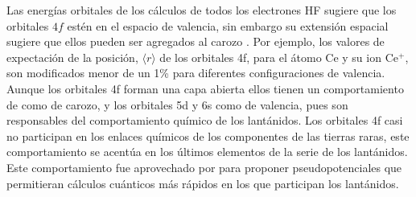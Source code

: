 Las energ\'ias orbitales de los c\'alculos de todos los electrones HF
sugiere que los orbitales $4f$ est\'en en el espacio de valencia, sin 
embargo su extensi\'on espacial sugiere que ellos pueden ser 
agregados al carozo \citep{Dolg1989}. Por ejemplo, los valores de
expectaci\'on de la posici\'on, $\langle r \rangle$ de los orbitales
4f, para el \'atomo Ce y su ion Ce$^+$, son modificados menor de un 
1\% para diferentes configuraciones de valencia. Aunque los orbitales
4f forman una capa abierta ellos tienen un comportamiento de como de
carozo, y los orbitales 5d y 6s como de valencia, pues son 
responsables del comportamiento qu\'imico de los lant\'anidos. Los 
orbitales 4f casi no participan en los enlaces qu\'imicos de los 
componentes de las tierras raras, este comportamiento se acent\'ua en
los \'ultimos elementos de la serie de los lant\'anidos. Este 
comportamiento fue aprovechado por \cite{Dolg1989} para proponer
pseudopotenciales que permitieran c\'alculos cu\'anticos m\'as 
r\'apidos en los que participan los lant\'anidos.

